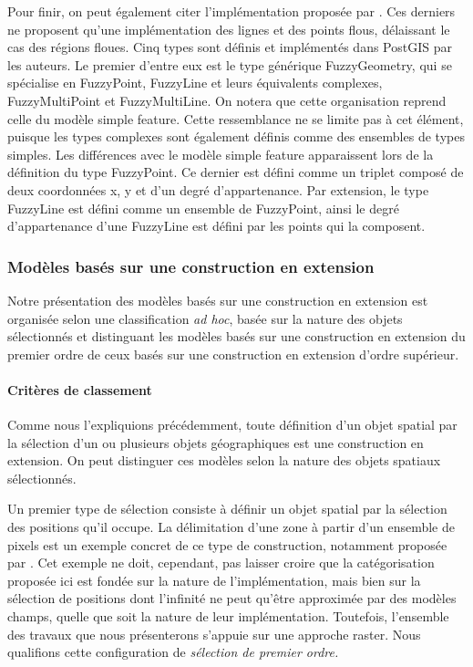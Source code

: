 Pour finir, on peut également citer l’implémentation proposée par
\textcite{Carniel2016}. Ces derniers ne proposent qu’une
implémentation des lignes et des points flous, délaissant le cas des
régions floues. Cinq types sont définis et implémentés dans PostGIS
par les auteurs. Le premier d’entre eux est le type générique
FuzzyGeometry, qui se spécialise en FuzzyPoint, FuzzyLine et leurs
équivalents complexes, FuzzyMultiPoint et FuzzyMultiLine. On notera
que cette organisation reprend celle du modèle simple feature. Cette
ressemblance ne se limite pas à cet élément, puisque les types
complexes sont également définis comme des ensembles de types
simples. Les différences avec le modèle simple feature apparaissent
lors de la définition du type FuzzyPoint. Ce dernier est défini comme
un triplet composé de deux coordonnées x, y et d’un degré
d’appartenance. Par extension, le type FuzzyLine est défini comme un
ensemble de FuzzyPoint, ainsi le degré d’appartenance d’une FuzzyLine
est défini par les points qui la composent.

\subsubsection{Modèles basés sur une construction en extension}

Notre présentation des modèles basés sur une construction en extension
est organisée selon une classification \emph{ad hoc}, basée sur la
nature des objets sélectionnés et distinguant les modèles basés sur
une construction en extension du premier ordre de ceux basés sur une
construction en extension d’ordre supérieur.

\paragraph{Critères de classement}

Comme nous l’expliquions précédemment, toute définition d’un objet
spatial par la sélection d’un ou plusieurs objets géographiques est
une construction en extension. On peut distinguer ces modèles selon la
nature des objets spatiaux sélectionnés.

Un premier type de sélection consiste à définir un objet spatial par
la sélection des positions qu’il occupe. La délimitation d’une zone à
partir d’un ensemble de pixels est un exemple concret de ce type de
construction, notamment proposée par \textcite{Zhan1997}. Cet exemple
ne doit, cependant, pas laisser croire que la catégorisation proposée
ici est fondée sur la nature de l’implémentation, mais bien sur la
sélection de positions dont l’infinité ne peut qu’être approximée par
des modèles champs, quelle que soit la nature de leur
implémentation. Toutefois, l’ensemble des travaux que nous
présenterons s’appuie sur une approche raster. Nous qualifions cette
configuration de \emph{sélection de premier ordre.}

